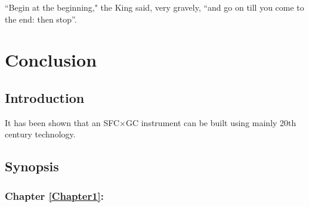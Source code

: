 
\begin{savequote}[45mm]
``Begin at the beginning," the King said, very gravely, ``and go on till you come to the end: then stop''.
\end{savequote}

\chapter{Conclusion} %


\label{Chapter8} %



\section{Introduction}

It has been shown that an SFC×GC instrument can be built using mainly 20th century technology. 

\section{Synopsis}

\subsection{Chapter \ref{Chapter1}:  }

